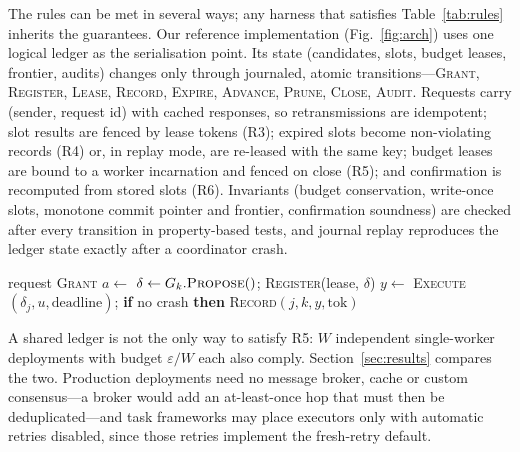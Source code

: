 \documentclass[pdflatex,sn-mathphys-num]{sn-jnl}
\theoremstyle{thmstyleone}
\theoremstyle{thmstyletwo}
\theoremstyle{thmstylethree}
\begin{document}
The rules can be met in several ways; any harness that satisfies Table~\ref{tab:rules} inherits the guarantees. Our reference implementation (Fig.~\ref{fig:arch}) uses one logical ledger as the serialisation point. Its state (candidates, slots, budget leases, frontier, audits) changes only through journaled, atomic transitions---\textsc{Grant}, \textsc{Register}, \textsc{Lease}, \textsc{Record}, \textsc{Expire}, \textsc{Advance}, \textsc{Prune}, \textsc{Close}, \textsc{Audit}. Requests carry (sender, request id) with cached responses, so retransmissions are idempotent; slot results are fenced by lease tokens (R3); expired slots become non-violating records (R4) or, in replay mode, are re-leased with the same key; budget leases are bound to a worker incarnation and fenced on close (R5); and confirmation is recomputed from stored slots (R6). Invariants (budget conservation, write-once slots, monotone commit pointer and frontier, confirmation soundness) are checked after every transition in property-based tests, and journal replay reproduces the ledger state exactly after a coordinator crash.

\begin{algorithm}[!htbp]
\caption{Worker loop. Any scheduling policy is valid under Theorem~\ref{thm:seq}.}\label{alg:worker}
\begin{algorithmic}[1]
\Loop
{} \State request \textsc{Grant} \EndIf
\State $a\gets$ 
 \State $\delta\gets G_k.\textsc{Propose}()$; \textsc{Register}(lease, $\delta$) 
    \State $y\gets$ \textsc{Execute}$(\delta_j,u,\text{deadline})$; \textbf{if} no crash \textbf{then} \textsc{Record}$(j,k,y,\text{tok})$ 
  \EndFor
\EndIf
\EndLoop
\end{algorithmic}
\end{algorithm}

A shared ledger is not the only way to satisfy R5: $W$ independent single-worker deployments with budget $\varepsilon/W$ each also comply. Section~\ref{sec:results} compares the two. Production deployments need no message broker, cache or custom consensus---a broker would add an at-least-once hop that must then be deduplicated---and task frameworks may place executors only with automatic retries disabled, since those retries implement the fresh-retry default.

\end{document}

